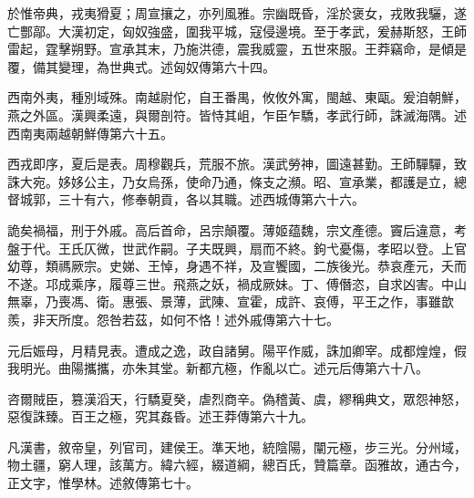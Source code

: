 \begin{pinyinscope}
於惟帝典，戎夷猾夏；周宣攘之，亦列風雅。宗幽既昏，淫於褒女，戎敗我驪，遂亡酆鄗。大漢初定，匈奴強盛，圍我平城，寇侵邊境。至于孝武，爰赫斯怒，王師雷起，霆擊朔野。宣承其末，乃施洪德，震我威靈，五世來服。王莽竊命，是傾是覆，備其變理，為世典式。述匈奴傳第六十四。

西南外夷，種別域殊。南越尉佗，自王番禺，攸攸外寓，閩越、東甌。爰洎朝鮮，燕之外區。漢興柔遠，與爾剖符。皆恃其岨，乍臣乍驕，孝武行師，誅滅海隅。述西南夷兩越朝鮮傳第六十五。

西戎即序，夏后是表。周穆觀兵，荒服不旅。漢武勞神，圖遠甚勤。王師驒驒，致誅大宛。姼姼公主，乃女烏孫，使命乃通，條支之瀕。昭、宣承業，都護是立，總督城郭，三十有六，修奉朝貢，各以其職。述西城傳第六十六。

詭矣禍福，刑于外戚。高后首命，呂宗顛覆。薄姬蕴魏，宗文產德。竇后違意，考盤于代。王氏仄微，世武作嗣。子夫既興，扇而不終。鉤弋憂傷，孝昭以登。上官幼尊，類禡厥宗。史娣、王悼，身遇不祥，及宣饗國，二族後光。恭哀產元，夭而不遂。邛成乘序，履尊三世。飛燕之妖，禍成厥妹。丁、傅僭恣，自求凶害。中山無辜，乃喪馮、衛。惠張、景薄，武陳、宣霍，成許、哀傅，平王之作，事雖歆羨，非天所度。怨咎若茲，如何不恪！述外戚傳第六十七。

元后娠母，月精見表。遭成之逸，政自諸舅。陽平作威，誅加卿宰。成都煌煌，假我明光。曲陽攜攜，亦朱其堂。新都亢極，作亂以亡。述元后傳第六十八。

咨爾賊臣，篡漢滔天，行驕夏癸，虐烈商辛。偽稽黃、虞，繆稱典文，眾怨神怒，惡復誅臻。百王之極，究其姦昏。述王莽傳第六十九。

凡漢書，敘帝皇，列官司，建侯王。準天地，統陰陽，闡元極，步三光。分州域，物土疆，窮人理，該萬方。緯六經，綴道綱，總百氏，贊篇章。函雅故，通古今，正文字，惟學林。述敘傳第七十。


\end{pinyinscope}
